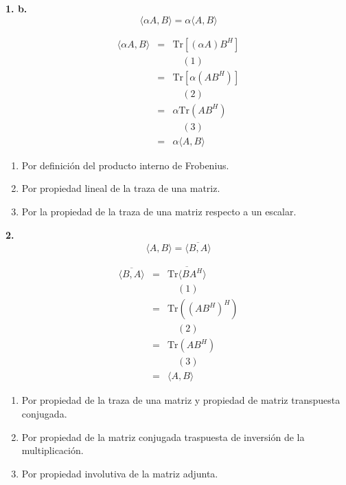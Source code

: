 \documentclass{article}
\begin{document}
\textbf{1. b.}
\[
\langle \alpha A, B \rangle = \alpha \langle A, B \rangle
\]

\[
\begin{array}{rcl}
\langle \alpha A, B \rangle & = & \text{Tr}[(\alpha A) B^H] \\
                            &   & \quad (\text{1}) \\
                            & = & \text{Tr}[\alpha (A B^H)] \\
                            &   & \quad (\text{2}) \\
                            & = & \alpha \text{Tr}(A B^H) \\
                            &   & \quad (\text{3}) \\
                            & = &  \alpha \langle A, B \rangle
\end{array}
\]

\begin{enumerate}
    \item Por definición del producto interno de Frobenius.
    \item Por propiedad lineal de la traza de una matriz.
    \item Por la propiedad de la traza de una matriz respecto a un escalar. 
\end{enumerate}

\textbf{2.}
\[
\langle A, B \rangle = \overline{\langle B, A \rangle}
\]

\[
\begin{array}{rcl}
\overline{\langle B, A \rangle} & = & \overline{\text{Tr}\langle  BA^H \rangle} \\
                         &   & \quad (\text{1}) \\
                         & = & \text{Tr}((AB^H)^H) \\
                         &   & \quad (\text{2}) \\
                         & = & \text{Tr}(AB^H) \\
                         &   & \quad (\text{3}) \\
                         & = & \langle A, B \rangle
\end{array}
\]

\begin{enumerate}
    \item Por propiedad de la traza de una matriz y propiedad de matriz transpuesta conjugada.
    \item Por propiedad de la matriz conjugada traspuesta de inversión de la multiplicación.
    \item Por propiedad involutiva de la matriz adjunta.
\end{enumerate}
\end{document}
